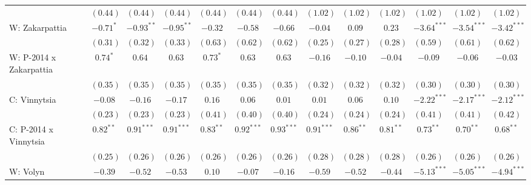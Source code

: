 \begin{table}
\begin{center}
\begin{tiny}
\begin{tabular}{l c c c c c c c c c c c c}
                            & $(0.44)$      & $(0.44)$      & $(0.44)$      & $(0.44)$     & $(0.44)$     & $(0.44)$     & $(1.02)$      & $(1.02)$      & $(1.02)$       & $(1.02)$      & $(1.02)$      & $(1.02)$      \\
W: Zakarpattia              & $-0.71^{*}$   & $-0.93^{**}$  & $-0.95^{**}$  & $-0.32$      & $-0.58$      & $-0.66$      & $-0.04$       & $0.09$        & $0.23$         & $-3.64^{***}$ & $-3.54^{***}$ & $-3.42^{***}$ \\
                            & $(0.31)$      & $(0.32)$      & $(0.33)$      & $(0.63)$     & $(0.62)$     & $(0.62)$     & $(0.25)$      & $(0.27)$      & $(0.28)$       & $(0.59)$      & $(0.61)$      & $(0.62)$      \\
W: P-2014 x Zakarpattia     & $0.74^{*}$    & $0.64$        & $0.63$        & $0.73^{*}$   & $0.63$       & $0.63$       & $-0.16$       & $-0.10$       & $-0.04$        & $-0.09$       & $-0.06$       & $-0.03$       \\
                            & $(0.35)$      & $(0.35)$      & $(0.35)$      & $(0.35)$     & $(0.35)$     & $(0.35)$     & $(0.32)$      & $(0.32)$      & $(0.32)$       & $(0.30)$      & $(0.30)$      & $(0.30)$      \\
C: Vinnytsia                & $-0.08$       & $-0.16$       & $-0.17$       & $0.16$       & $0.06$       & $0.01$       & $0.01$        & $0.06$        & $0.10$         & $-2.22^{***}$ & $-2.17^{***}$ & $-2.12^{***}$ \\
                            & $(0.23)$      & $(0.23)$      & $(0.23)$      & $(0.41)$     & $(0.40)$     & $(0.40)$     & $(0.24)$      & $(0.24)$      & $(0.24)$       & $(0.41)$      & $(0.41)$      & $(0.42)$      \\
C: P-2014 x Vinnytsia       & $0.82^{**}$   & $0.91^{***}$  & $0.91^{***}$  & $0.83^{**}$  & $0.92^{***}$ & $0.93^{***}$ & $0.91^{***}$  & $0.86^{**}$   & $0.81^{**}$    & $0.73^{**}$   & $0.70^{**}$   & $0.68^{**}$   \\
                            & $(0.25)$      & $(0.26)$      & $(0.26)$      & $(0.26)$     & $(0.26)$     & $(0.26)$     & $(0.28)$      & $(0.28)$      & $(0.28)$       & $(0.26)$      & $(0.26)$      & $(0.26)$      \\
W: Volyn                    & $-0.39$       & $-0.52$       & $-0.53$       & $0.10$       & $-0.07$      & $-0.16$      & $-0.59$       & $-0.52$       & $-0.44$        & $-5.13^{***}$ & $-5.05^{***}$ & $-4.94^{***}$ \\

\end{tabular}
\end{tiny}
\end{center}
\end{table}
